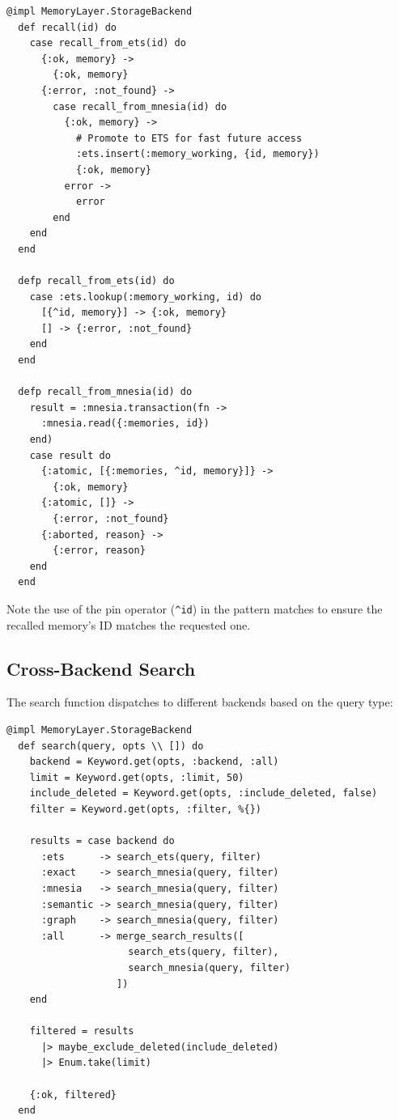\documentclass[12pt,a4paper]{article}
\theoremstyle{definition}
\begin{document}
\begin{lstlisting}[caption={Tiered recall: ETS fast path with Mnesia fallback and promotion.}, label={lst:storage-recall}]
  @impl MemoryLayer.StorageBackend
  def recall(id) do
    case recall_from_ets(id) do
      {:ok, memory} ->
        {:ok, memory}
      {:error, :not_found} ->
        case recall_from_mnesia(id) do
          {:ok, memory} ->
            # Promote to ETS for fast future access
            :ets.insert(:memory_working, {id, memory})
            {:ok, memory}
          error ->
            error
        end
    end
  end

  defp recall_from_ets(id) do
    case :ets.lookup(:memory_working, id) do
      [{^id, memory}] -> {:ok, memory}
      [] -> {:error, :not_found}
    end
  end

  defp recall_from_mnesia(id) do
    result = :mnesia.transaction(fn ->
      :mnesia.read({:memories, id})
    end)
    case result do
      {:atomic, [{:memories, ^id, memory}]} ->
        {:ok, memory}
      {:atomic, []} ->
        {:error, :not_found}
      {:aborted, reason} ->
        {:error, reason}
    end
  end
\end{lstlisting}

Note the use of the pin operator (\texttt{\^{}id}) in the pattern matches to ensure the recalled memory's ID matches the requested one.

\subsection{Cross-Backend Search}\label{subsec:cross-backend-search}

The search function dispatches to different backends based on the query type:

\begin{lstlisting}[caption={Multi-backend search dispatch.}, label={lst:storage-search}]
  @impl MemoryLayer.StorageBackend
  def search(query, opts \\ []) do
    backend = Keyword.get(opts, :backend, :all)
    limit = Keyword.get(opts, :limit, 50)
    include_deleted = Keyword.get(opts, :include_deleted, false)
    filter = Keyword.get(opts, :filter, %{})

    results = case backend do
      :ets      -> search_ets(query, filter)
      :exact    -> search_mnesia(query, filter)
      :mnesia   -> search_mnesia(query, filter)
      :semantic -> search_mnesia(query, filter)
      :graph    -> search_mnesia(query, filter)
      :all      -> merge_search_results([
                     search_ets(query, filter),
                     search_mnesia(query, filter)
                   ])
    end

    filtered = results
      |> maybe_exclude_deleted(include_deleted)
      |> Enum.take(limit)

    {:ok, filtered}
  end
\end{lstlisting}
\end{document}
